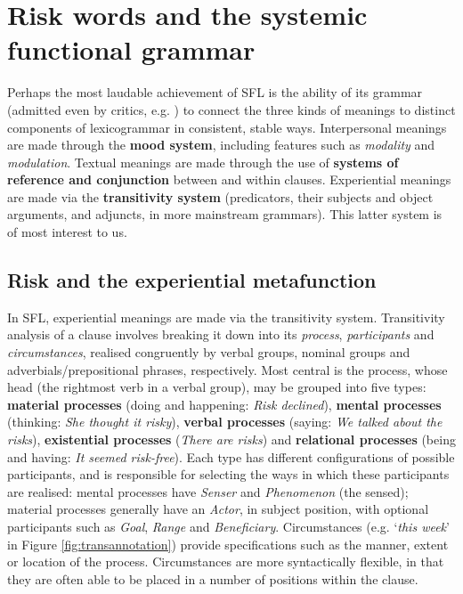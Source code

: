 \section{Risk words and the systemic functional grammar}

Perhaps the most laudable achievement of SFL is the ability of its grammar (admitted even by critics, e.g. ) to connect the three kinds of meanings to distinct components of lexicogrammar in consistent, stable ways. Interpersonal meanings are made through the \textbf{mood system}, including features such as \emph{modality} and \emph{modulation}. Textual meanings are made through the use of \textbf{systems of reference and conjunction} between and within clauses. Experiential meanings are made via the \textbf{transitivity system} (predicators, their subjects and object arguments, and adjuncts, in more mainstream grammars). This latter system is of most interest to us.~

\subsection{Risk and the experiential metafunction}

In SFL, experiential meanings are made via the transitivity system. Transitivity analysis of a clause involves breaking it down into its \emph{process}, \emph{participants} and \emph{circumstances}, realised congruently by verbal groups, nominal groups and adverbials/prepositional phrases, respectively. Most central is the process, whose head (the rightmost verb in a verbal group), may be grouped into five types: \textbf{material processes} (doing and happening: \emph{Risk declined}), \textbf{mental processes} (thinking: \emph{She thought it risky}), \textbf{verbal processes} (saying: \emph{We talked about the risks}), \textbf{existential processes} (\emph{There are risks}) and \textbf{relational processes} (being and having: \emph{It seemed risk-free}). Each type has different configurations of possible participants, and is responsible for selecting the ways in which these participants are realised: mental processes have \emph{Senser} and \emph{Phenomenon} (the sensed); material processes generally have an \emph{Actor}, in subject position, with optional participants such as \emph{Goal}, \emph{Range} and \emph{Beneficiary}. Circumstances (e.g. `\emph{this week}' in Figure \ref{fig:transannotation}) provide specifications such as the manner, extent or location of the process. Circumstances are more syntactically flexible, in that they are often able to be placed in a number of positions within the clause.

